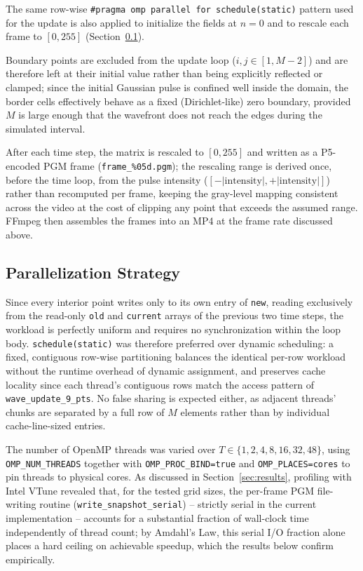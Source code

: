 The same row-wise \texttt{\#pragma omp parallel for
schedule(static)} pattern used for the update is also applied to
initialize the fields at $n=0$ and to rescale each frame to
$[0,255]$ (Section~\ref{sec:parallelization}).

Boundary points are excluded from the update loop ($i,j \in
[1,M-2]$) and are therefore left at their initial value rather than
being explicitly reflected or clamped; since the initial Gaussian
pulse is confined well inside the domain, the border cells
effectively behave as a fixed (Dirichlet-like) zero boundary,
provided $M$ is large enough that the wavefront does not reach the
edges during the simulated interval.

After each time step, the matrix is rescaled to $[0,255]$ and
written as a P5-encoded PGM frame (\texttt{frame\_\%05d.pgm}); the
rescaling range is derived once, before the time loop, from the
pulse intensity ($[-|\text{intensity}|, +|\text{intensity}|]$)
rather than recomputed per frame, keeping the gray-level mapping
consistent across the video at the cost of clipping any point that
exceeds the assumed range. FFmpeg then assembles the frames into an
MP4 at the frame rate discussed above.

\subsection{Parallelization Strategy}
\label{sec:parallelization}
Since every interior point writes only to its own entry of
\texttt{new}, reading exclusively from the read-only \texttt{old}
and \texttt{current} arrays of the previous two time steps, the
workload is perfectly uniform and requires no synchronization within
the loop body. \texttt{schedule(static)} was therefore preferred
over dynamic scheduling: a fixed, contiguous row-wise partitioning
balances the identical per-row workload without the runtime overhead
of dynamic assignment, and preserves cache locality since each
thread's contiguous rows match the access pattern of
\texttt{wave\_update\_9\_pts}. No false sharing is expected either,
as adjacent threads' chunks are separated by a full row of $M$
elements rather than by individual cache-line-sized entries.

The number of OpenMP threads was varied over $T \in \{1, 2, 4, 8,
16, 32, 48\}$, using \texttt{OMP\_NUM\_THREADS} together with
\texttt{OMP\_PROC\_BIND=true} and \texttt{OMP\_PLACES=cores} to pin
threads to physical cores. As discussed in Section~\ref{sec:results},
profiling with Intel VTune revealed that, for the tested grid sizes,
the per-frame PGM file-writing routine
(\texttt{write\_snapshot\_serial}) -- strictly serial in the current
implementation -- accounts for a substantial fraction of wall-clock
time independently of thread count; by Amdahl's Law, this serial
I/O fraction alone places a hard ceiling on achievable speedup, which
the results below confirm empirically.


